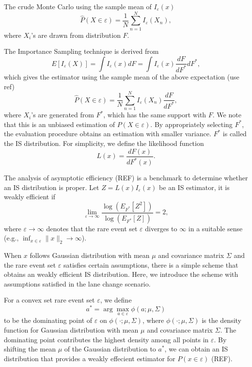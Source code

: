 \documentclass[conference]{IEEEtran}
\begin{document}
The crude Monte Carlo using the sample mean of $I_\varepsilon(x)$ \begin{equation}
	\hat{P}(X \in \varepsilon) = \frac{1}{N} \sum_{n=1}^N I_\varepsilon(X_n),
\end{equation}
where $X_i$'s are drawn from distribution $F$.

The Importance Sampling \cite{Bucklew2004a} technique is derived from\begin{equation}
	E[I_\varepsilon(X)]=\int I_\varepsilon(x) dF = \int I_\varepsilon(x) \frac{dF}{dF^*} dF^* ,
\end{equation}
which gives the estimator using the sample mean of the above expectation (use ref) \begin{equation}
	\hat{P}(X \in \varepsilon) = \frac{1}{N} \sum_{n=1}^N I_\varepsilon(X_n) \frac{dF}{dF^*},
\end{equation}
where $X_i$'s are generated from $F^*$, which has the same support with $F$. We note that this is an unbiased estimation of ${P}(X \in \varepsilon) $. By appropriately selecting $F^*$, the evaluation procedure obtains an estimation with smaller variance. $F^*$ is called the IS distribution. For simplicity, we define the likelihood function \begin{equation}
L(x)=\frac{dF(x)}{dF^*(x)}.
\end{equation}

The analysis of asymptotic efficiency (REF) is a benchmark to determine whether an IS distribution is proper. Let $Z=L(x) I_\varepsilon(x)$ be an IS estimator, it is weakly efficient if \begin{equation}
\lim_{\varepsilon \rightarrow \infty} \frac{\log \left( E_{F^*} [Z^2] \right)}{\log \left( E_{F^*}[Z] \right)} = 2,
\end{equation}
where $\varepsilon \rightarrow \infty$ denotes that the rare event set $\varepsilon$ diverges to $\infty$ in a suitable sense (e.g., $\inf_{x\in \varepsilon}  \| x\|_2 \rightarrow \infty $).

When $x$ follows Gaussian distribution with mean $\mu$ and covariance matrix $\Sigma$ and the rare event set $\varepsilon$ satisfies certain assumptions, there is a simple scheme that obtains an weakly efficient IS distribution. Here, we introduce the scheme with assumptions satisfied in the lane change scenario.

For a convex set rare event set $\varepsilon$, we define \begin{equation}
	a^*=\arg \max_{a\in \varepsilon} \phi(a;\mu,\Sigma)
\end{equation}
to be the dominating point of $\varepsilon$ on $\phi(\cdot;\mu,\Sigma)$, where $\phi(\cdot;\mu,\Sigma)$ is the density function for Gaussian distribution with mean $\mu$ and covariance matrix $\Sigma$. The dominating point contributes the highest density among all points in $\varepsilon$. By shifting the mean $\mu$ of the Gaussian distribution to $a^*$, we can obtain an IS distribution that provides a weakly effecient estimator for $P(x \in \varepsilon)$ (REF).
\end{document}
